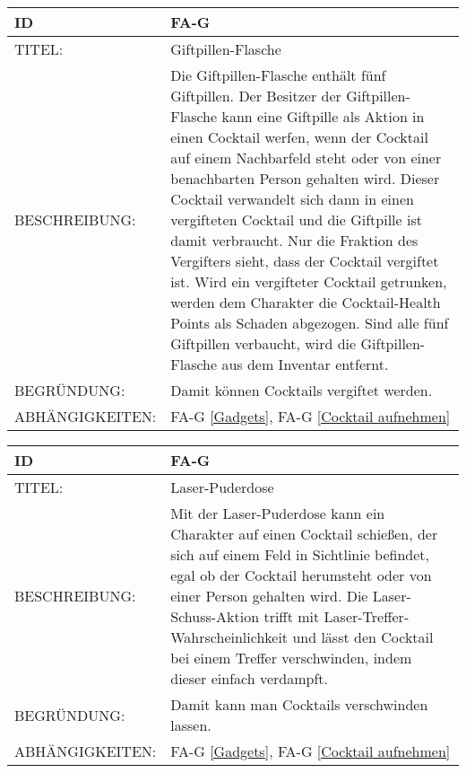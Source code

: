 \begin{tabularx}{16cm}{l|X}
	{table}\label{Giftpillen-Flasche}
	\textbf{ID} & \textbf{FA-G \arabic{table}} \\
	\hline
	TITEL: & Giftpillen-Flasche \\
	\hline
	BESCHREIBUNG: & Die Giftpillen-Flasche enthält fünf Giftpillen. Der Besitzer der Giftpillen-Flasche kann eine Giftpille als Aktion in einen Cocktail werfen, wenn der Cocktail auf einem Nachbarfeld steht oder von einer benachbarten Person gehalten wird. Dieser Cocktail verwandelt sich dann in einen vergifteten Cocktail und die Giftpille ist damit verbraucht. Nur die Fraktion des Vergifters sieht, dass der Cocktail vergiftet ist. Wird ein vergifteter Cocktail getrunken, werden dem Charakter die Cocktail-Health Points als Schaden abgezogen. Sind alle fünf Giftpillen verbaucht, wird die Giftpillen-Flasche aus dem Inventar entfernt.  \\
	\hline
	BEGRÜNDUNG: &  Damit können Cocktails vergiftet werden. \\
	\hline
	ABHÄNGIGKEITEN: & FA-G \ref{Gadgets}, FA-G \ref{Cocktail aufnehmen} \\
\end{tabularx}

\begin{tabularx}{16cm}{l|X}
	{table}\label{Laser-Puderdose}
	\textbf{ID} & \textbf{FA-G \arabic{table}} \\
	\hline
	TITEL: & Laser-Puderdose \\
	\hline
	BESCHREIBUNG: & Mit der Laser-Puderdose kann ein Charakter auf einen Cocktail schießen, der sich auf einem Feld in Sichtlinie befindet, egal ob der Cocktail herumsteht oder von einer Person gehalten wird. Die Laser-Schuss-Aktion trifft mit Laser-Treffer-Wahrscheinlichkeit und lässt den Cocktail bei einem Treffer verschwinden, indem dieser einfach verdampft. \\
	\hline
	BEGRÜNDUNG: &  Damit kann man Cocktails verschwinden lassen. \\
	\hline
	ABHÄNGIGKEITEN: & FA-G \ref{Gadgets}, FA-G \ref{Cocktail aufnehmen} \\
\end{tabularx}

